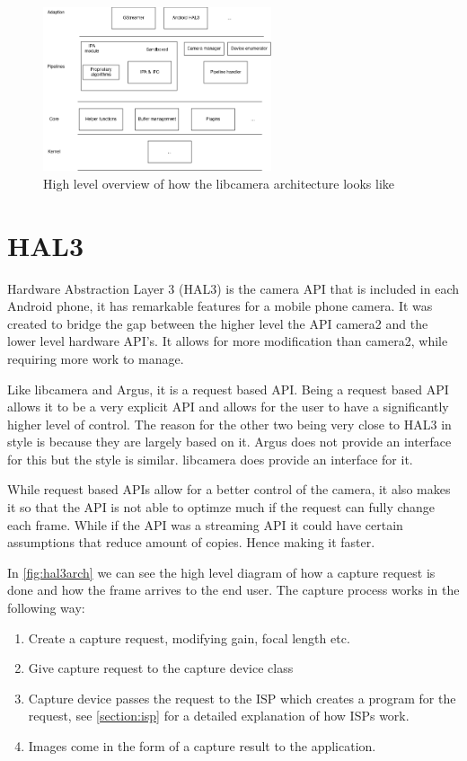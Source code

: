 \begin{figure}
    \begin{center}
        \includegraphics[width=0.60\textwidth]{figures/libcameraarch.png}
    \end{center}
    \caption{High level overview of how the libcamera architecture looks like}
    \label{fig:libcameraarch}
\end{figure}


\section{HAL3}
Hardware Abstraction Layer 3 (HAL3) is the camera API that is included in each
Android phone, it has remarkable features for a mobile phone camera. It was
created to bridge the gap between the higher level the API camera2 and the
lower level hardware API's. It allows for more modification than camera2, while
requiring more work to manage.

Like libcamera and Argus, it is a request based API. Being a request based API
allows it to be a very explicit API and allows for the user to have a
significantly higher level of control. The reason for the other
two being very close to HAL3 in style is because they are largely based on it.
Argus does not provide an interface for this but the style is similar. libcamera
does provide an interface for it.

While request based APIs allow for a better control of the camera, it also
makes it so that the API is not able to optimze much if the request can fully
change each frame. While if the API was a streaming API it could have certain
assumptions that reduce amount of copies. Hence making it faster.

In \cref{fig:hal3arch} we can see the high level diagram of how a capture
request is done and how the frame arrives to the end user. The capture process
works in the following way:

\begin{enumerate}
    \item Create a capture request, modifying gain, focal length etc.
    \item Give capture request to the capture device class
    \item Capture device passes the request to the ISP which creates a program
        for the request, see \cref{section:isp} for a detailed explanation of
        how ISPs work.

    \item Images come in the form of a capture result to the application.
\end{enumerate}


